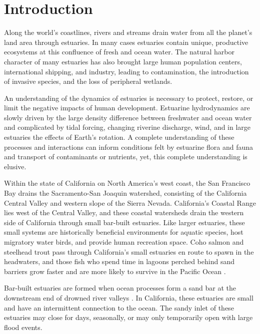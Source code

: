 \chapter{Introduction}
\label{chIntro}

Along the world's coastlines, rivers and streams drain water from all the planet's land area through estuaries.  In many cases estuaries contain unique, productive ecosystems at this confluence of fresh and ocean water. The natural harbor character of many estuaries has also brought large human population centers, international shipping, and industry, leading to contamination, the introduction of invasive species, and the loss of peripheral wetlands. 

An understanding of the dynamics of estuaries is necessary to protect, restore, or limit the negative impacts of human development. Estuarine hydrodynamics are slowly driven by the large density difference between freshwater and ocean water and complicated by tidal forcing, changing riverine discharge, wind, and in large estuaries the effects of Earth's rotation. A complete understanding of these processes and interactions can inform conditions felt by estuarine flora and fauna and transport of contaminants or nutrients, yet, this complete understanding is elusive.

Within the state of California on North America's west coast, the San Francisco Bay drains the Sacramento-San Joaquin watershed, consisting of the California Central Valley and western slope of the Sierra Nevada. California's Coastal Range lies west of the Central Valley, and these coastal watersheds drain the western side of California through small bar-built estuaries. Like larger estuaries, these small systems are historically beneficial environments for aquatic species, host migratory water birds, and provide human recreation space. Coho salmon and steelhead trout pass through California's small estuaries en route to spawn in the headwaters, and those fish who spend time in lagoons perched behind sand barriers grow faster and are more likely to survive in the Pacific Ocean \parencite{hayes_steelhead_2008, bond_marine_2008}. 

Bar-built estuaries are formed when ocean processes form a sand bar at the downstream end of drowned river valleys \parencite{nielsen_coastal_2009}. In California, these estuaries are small and have an intermittent connection to the ocean. The sandy inlet of these estuaries may close for days, seasonally, or may only temporarily open with large flood events. 

